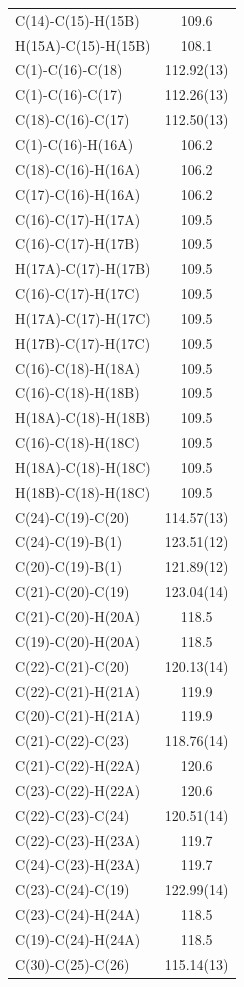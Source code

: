 \begin{center}
{\begin{supertabular}{p{1.5in}c}
C(14)-C(15)-H(15B)&109.6\\
H(15A)-C(15)-H(15B)&108.1\\
C(1)-C(16)-C(18)&112.92(13)\\
C(1)-C(16)-C(17)&112.26(13)\\
C(18)-C(16)-C(17)&112.50(13)\\
C(1)-C(16)-H(16A)&106.2\\
C(18)-C(16)-H(16A)&106.2\\
C(17)-C(16)-H(16A)&106.2\\
C(16)-C(17)-H(17A)&109.5\\
C(16)-C(17)-H(17B)&109.5\\
H(17A)-C(17)-H(17B)&109.5\\
C(16)-C(17)-H(17C)&109.5\\
H(17A)-C(17)-H(17C)&109.5\\
H(17B)-C(17)-H(17C)&109.5\\
C(16)-C(18)-H(18A)&109.5\\
C(16)-C(18)-H(18B)&109.5\\
H(18A)-C(18)-H(18B)&109.5\\
C(16)-C(18)-H(18C)&109.5\\
H(18A)-C(18)-H(18C)&109.5\\
H(18B)-C(18)-H(18C)&109.5\\
C(24)-C(19)-C(20)&114.57(13)\\
C(24)-C(19)-B(1)&123.51(12)\\
C(20)-C(19)-B(1)&121.89(12)\\
C(21)-C(20)-C(19)&123.04(14)\\
C(21)-C(20)-H(20A)&118.5\\
C(19)-C(20)-H(20A)&118.5\\
C(22)-C(21)-C(20)&120.13(14)\\
C(22)-C(21)-H(21A)&119.9\\
C(20)-C(21)-H(21A)&119.9\\
C(21)-C(22)-C(23)&118.76(14)\\
C(21)-C(22)-H(22A)&120.6\\
C(23)-C(22)-H(22A)&120.6\\
C(22)-C(23)-C(24)&120.51(14)\\
C(22)-C(23)-H(23A)&119.7\\
C(24)-C(23)-H(23A)&119.7\\
C(23)-C(24)-C(19)&122.99(14)\\
C(23)-C(24)-H(24A)&118.5\\
C(19)-C(24)-H(24A)&118.5\\
C(30)-C(25)-C(26)&115.14(13)\\

\end{supertabular}}
\end{center}
